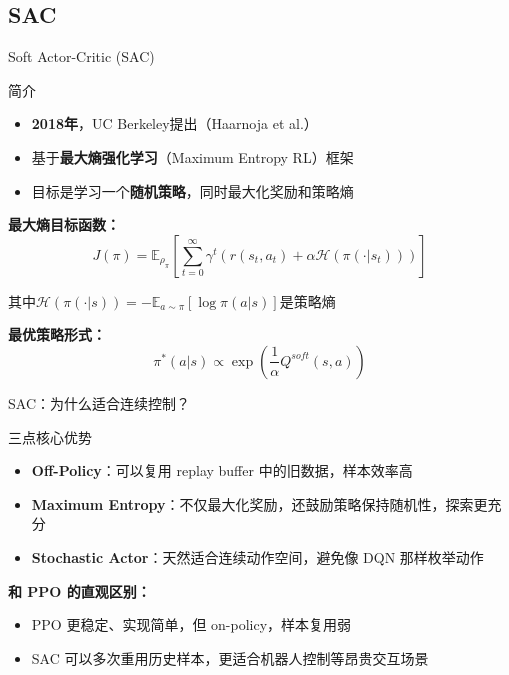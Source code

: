 \documentclass{beamer}
\begin{document}
\subsection{SAC}
\begin{frame}{Soft Actor-Critic (SAC)}
    \begin{block}{简介}
        \begin{itemize}
            \item \textbf{2018年}，UC Berkeley提出（Haarnoja et al.）
            \item 基于\textbf{最大熵强化学习}（Maximum Entropy RL）框架
            \item 目标是学习一个\textbf{随机策略}，同时最大化奖励和策略熵
        \end{itemize}
    \end{block}
    
    \textbf{最大熵目标函数：}
    \[ J(\pi) = \mathbb{E}_{\rho_\pi} \left[ \sum_{t=0}^{\infty} \gamma^t \left( r(s_t, a_t) + \alpha \mathcal{H}(\pi(\cdot|s_t)) \right) \right] \]
    
    其中$\mathcal{H}(\pi(\cdot|s)) = -\mathbb{E}_{a \sim \pi} [\log \pi(a|s)]$是策略熵
    
    \textbf{最优策略形式：}
        \[ \pi^*(a|s) \propto \exp\left( \frac{1}{\alpha} Q^{soft}(s,a) \right) \]
\end{frame}

\begin{frame}{SAC：为什么适合连续控制？}
    \begin{block}{三点核心优势}
        \begin{itemize}
            \item \textbf{Off-Policy}：可以复用 replay buffer 中的旧数据，样本效率高
            \item \textbf{Maximum Entropy}：不仅最大化奖励，还鼓励策略保持随机性，探索更充分
            \item \textbf{Stochastic Actor}：天然适合连续动作空间，避免像 DQN 那样枚举动作
        \end{itemize}
    \end{block}

    \textbf{和 PPO 的直观区别：}
    \begin{itemize}
        \item PPO 更稳定、实现简单，但 on-policy，样本复用弱
        \item SAC 可以多次重用历史样本，更适合机器人控制等昂贵交互场景
    \end{itemize}
\end{frame}
\end{document}
